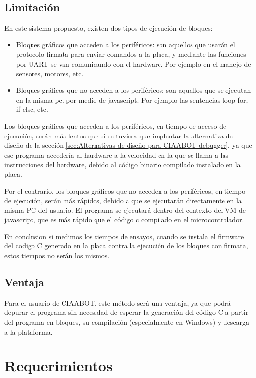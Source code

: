 \subsection{Limitación}
\label{subsec:Limitación}

En este sistema propuesto, existen dos tipos de ejecución de bloques:

\begin{itemize}
	\item Bloques gráficos que acceden a los periféricos: son aquellos que usarán el protocolo firmata para enviar comandos a la placa, y mediante las funciones por UART se van comunicando con el hardware. Por ejemplo en el manejo de sensores, motores, etc.
	\item Bloques gráficos que no acceden a los periféricos: son aquellos que se ejecutan en la misma pc, por medio de javascript. Por ejemplo las sentencias loop-for, if-else, etc.
\end{itemize}

Los bloques gráficos que acceden a los periféricos, en tiempo de acceso de ejecución,
serán más lentos que si se tuviera que implentar la alternativa de diseño de
la sección \ref{sec:Alternativas de diseño para CIAABOT debugger}, ya que ese programa accedería al hardware a la velocidad en la que
se llama a las instrucciones del hardware, debido al código binario compilado
instalado en la placa.

Por el contrario, los bloques gráficos que no acceden a los periféricos, en tiempo
de ejecución, serán más rápidos, debido a que se ejecutarán directamente en la
misma PC del usuario. El programa se ejecutará dentro del contexto del VM de
javascript, que es más rápido que el código c compilado en el microcontrolador.

En conclusion si medimos los tiempos de ensayos, cuando se instala el firmware
del codigo C generado en la placa contra la ejecución de los bloques con firmata, estos tiempos no serán los mismos.

\subsection{Ventaja}
\label{subsec:Ventaja}

Para el usuario de CIAABOT, este método será una ventaja, ya que podrá depurar el programa sin necesidad de esperar la generación del código C a partir del programa en bloques, su compilación (especialmente en Windows) y descarga a la plataforma.

\section{Requerimientos}
\label{sec:ejemplo}

